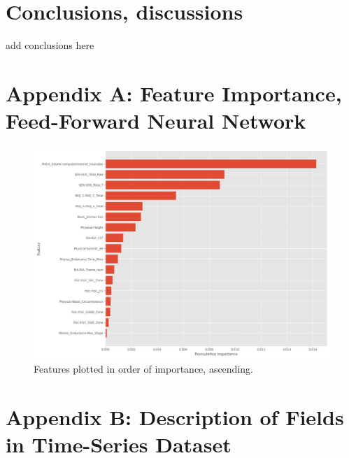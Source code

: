 \documentclass[11pt]{extarticle}
\begin{document}
\section{Conclusions, discussions}

\begin{mdframed}
    add conclusions here
\end{mdframed}

\pagebreak




\pagebreak

\section*{Appendix A: Feature Importance, Feed-Forward Neural Network}

\begin{figure}[h!]
    \centering
    \includegraphics[scale=0.4]{"./images/feature_importance.jpg"}
    \caption{Features plotted in order of importance, ascending.}
\end{figure}

\section*{Appendix B: Description of Fields in Time-Series Dataset}
\end{document}
